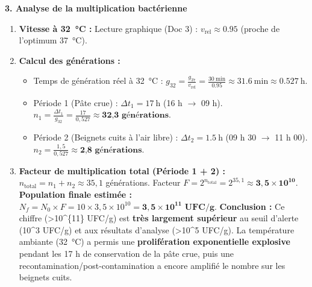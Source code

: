 \documentclass[11pt]{article}
\begin{document}
\begin{exoresolu}
\textbf{3. Analyse de la multiplication bactérienne}
\begin{enumerate}
    \item \textbf{Vitesse à \SI{32}{\celsius} :} Lecture graphique (Doc 3) : $v_{\text{rel}} \approx \num{0,95}$ (proche de l'optimum \SI{37}{\celsius}).
    \item \textbf{Calcul des générations :}
    \begin{itemize}
        \item Temps de génération réel à \SI{32}{\celsius} : $g_{32} = \frac{g_{37}}{v_{\text{rel}}} = \frac{\SI{30}{\minute}}{\num{0,95}} \approx \SI{31,6}{\minute} \approx \SI{0,527}{\hour}$.
        \item Période 1 (Pâte crue) : $\Delta t_1 = \SI{17}{\hour}$ (16 h $\rightarrow$ 09 h). 
        $n_1 = \frac{\Delta t_1}{g_{32}} = \frac{17}{0,527} \approx \textbf{32,3 générations}$.
        \item Période 2 (Beignets cuits à l'air libre) : $\Delta t_2 = \SI{1,5}{\hour}$ (09 h 30 $\rightarrow$ 11 h 00).
        $n_2 = \frac{1,5}{0,527} \approx \textbf{2,8 générations}$.
    \end{itemize}
    \item \textbf{Facteur de multiplication total (Période 1 + 2) :}
    $n_{\text{total}} = n_1 + n_2 \approx 35,1$ générations.
    Facteur $F = 2^{n_{\text{total}}} = 2^{35,1} \approx \mathbf{3,5 \times 10^{10}}$.
    \textbf{Population finale estimée :} $N_f = N_0 \times F = 10 \times 3,5 \times 10^{10} = \mathbf{3,5 \times 10^{11} \text{ UFC/g}}$.
    \textbf{Conclusion :} Ce chiffre (\textgreater \num{10^{11}} UFC/g) est \textbf{très largement supérieur} au seuil d'alerte (\num{10^3} UFC/g) et aux résultats d'analyse (\textgreater \num{10^5} UFC/g). La température ambiante (\SI{32}{\celsius}) a permis une \textbf{prolifération exponentielle explosive} pendant les 17 h de conservation de la pâte crue, puis une recontamination/post-contamination a encore amplifié le nombre sur les beignets cuits.
\end{enumerate}


\end{exoresolu}
\end{document}
